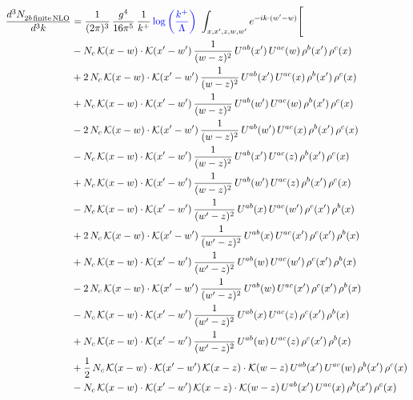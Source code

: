 \documentclass[9pt]{article}
\numberwithin{equation}{section}
\begin{document}
\begin{align}
    \frac{d^{3}N_{2b\,\rm finite\, NLO}^{\rm}}{d^{3}k} & = \frac{1}{(2\pi)^{3}}\,\frac{g^{4}}{16\pi^{5}}\,\frac{1}{k^{+}}\,{\color{blue}\log{\left(\frac{k^{+}}{\Lambda}\right)}}\,\,\int_{x,x',z,w,w'}e^{-ik\cdot(w'-w)}\Bigg[\notag\\ & -N_{c}\,\mathcal{K}(x-w)\cdot\mathcal{K}(x'-w')\,\frac{1}{(w-z)^{2}}\,U^{ab}(x')\,U^{ac}(w)\,\rho^{b}(x')\,\rho^{c}(x)\notag\\
&+2\,N_{c}\,\mathcal{K}(x-w)\cdot\mathcal{K}(x'-w')\,\frac{1}{(w-z)^{2}}\,U^{ab}(x')\,U^{ac}(x)\,\rho^{b}(x')\,\rho^{c}(x)\notag\\
&+N_{c}\,\mathcal{K}(x-w)\cdot\mathcal{K}(x'-w')\,\frac{1}{(w-z)^{2}}\,U^{ab}(w')\,U^{ac}(w)\,\rho^{b}(x')\,\rho^{c}(x)\notag\\
&-2\,N_{c}\,\mathcal{K}(x-w)\cdot\mathcal{K}(x'-w')\,\frac{1}{(w-z)^{2}}\,U^{ab}(w')\,U^{ac}(x)\,\rho^{b}(x')\,\rho^{c}(x)\notag\\
&-N_{c}\,\mathcal{K}(x-w)\cdot\mathcal{K}(x'-w')\,\frac{1}{(w-z)^{2}}\,U^{ab}(x')\,U^{ac}(z)\,\rho^{b}(x')\,\rho^{c}(x)\notag\\
&+N_{c}\,\mathcal{K}(x-w)\cdot\mathcal{K}(x'-w')\,\frac{1}{(w-z)^{2}}\,U^{ab}(w')\,U^{ac}(z)\,\rho^{b}(x')\,\rho^{c}(x)\notag\\
&-N_{c}\,\mathcal{K}(x-w)\cdot\mathcal{K}(x'-w')\,\frac{1}{(w'-z)^{2}}\,U^{ab}(x)\,U^{ac}(w')\,\rho^{c}(x')\,\rho^{b}(x)\notag\\
&+2\,N_{c}\,\mathcal{K}(x-w)\cdot\mathcal{K}(x'-w')\,\frac{1}{(w'-z)^{2}}\,U^{ab}(x)\,U^{ac}(x')\,\rho^{c}(x')\,\rho^{b}(x)\notag\\
&+N_{c}\,\mathcal{K}(x-w)\cdot\mathcal{K}(x'-w')\,\frac{1}{(w'-z)^{2}}\,U^{ab}(w)\,U^{ac}(w')\,\rho^{c}(x')\,\rho^{b}(x)\notag\\
&-2\,N_{c}\,\mathcal{K}(x-w)\cdot\mathcal{K}(x'-w')\,\frac{1}{(w'-z)^{2}}\,U^{ab}(w)\,U^{ac}(x')\,\rho^{c}(x')\,\rho^{b}(x)\notag\\
&-N_{c}\,\mathcal{K}(x-w)\cdot\mathcal{K}(x'-w')\,\frac{1}{(w'-z)^{2}}\,U^{ab}(x)\,U^{ac}(z)\,\rho^{c}(x')\,\rho^{b}(x)\notag\\
&+N_{c}\,\mathcal{K}(x-w)\cdot\mathcal{K}(x'-w')\,\frac{1}{(w'-z)^{2}}\,U^{ab}(w)\,U^{ac}(z)\,\rho^{c}(x')\,\rho^{b}(x)\notag\\
&+\frac{1}{2}\,N_{c}\,\mathcal{K}(x-w)\cdot\mathcal{K}(x'-w')\,\mathcal{K}(x-z)\cdot\mathcal{K}(w-z)\,U^{ab}(x')\,U^{ac}(w)\,\rho^{b}(x')\,\rho^{c}(x)\notag\\
&-N_{c}\,\mathcal{K}(x-w)\cdot\mathcal{K}(x'-w')\,\mathcal{K}(x-z)\cdot\mathcal{K}(w-z)\,U^{ab}(x')\,U^{ac}(x)\,\rho^{b}(x')\,\rho^{c}(x)\notag\\

\end{align}
\end{document}
